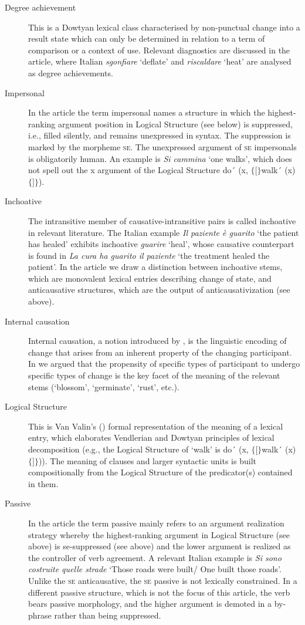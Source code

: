 \documentclass[output=paper,colorlinks,citecolor=brown
]{langscibook}
\begin{document}
\begin{description}
\item[Degree   achievement] This is a Dowtyan lexical class   characterised by non-punctual change into a result state which can only be   determined in relation to a term of comparison or a context of use. Relevant   diagnostics are discussed in the article, where Italian \textit{sgonfiare}   ‘deflate’ and \textit{riscaldare} ‘heat’ are analysed as degree achievements.
\item[Impersonal] In the article the term impersonal   names a structure in which the highest-ranking argument position in Logical   Structure (see below) is suppressed, i.e., filled silently, and remains   unexpressed in syntax. The suppression is marked by the morpheme \textsc{se}. The unexpressed argument of \textsc{se} impersonals is obligatorily human.  An example is \textit{Si cammina} ‘one   walks’, which does not spell out the x argument of the Logical Structure do´ (x, $\{ [ \}$walk´ (x) $\{] \}$).
\item[Inchoative] The intransitive member of   causative-intransitive pairs is called inchoative in relevant   literature. The Italian example \textit{Il paziente è guarito} ‘the patient has   healed’ exhibits inchoative \textit{guarire} ‘heal’, whose causative   counterpart is found in \textit{La cura ha guarito il paziente} ‘the treatment   healed the patient’. In the article we draw a distinction between inchoative stems,   which are monovalent lexical entries describing change of state, and anticausative   structures, which are the output of anticausativization (see above).
\item[Internal   causation] Internal causation, a notion introduced   by \citet{levin1995unaccusativity}, is the linguistic encoding of change   that arises from an inherent property of the changing participant. In \citet{bentley2023internally} we argued that the propensity of specific types of participant to   undergo specific types of change is the key facet of the meaning of the   relevant stems (‘blossom’, ‘germinate’, ‘rust’, etc.).
\item[Logical   Structure] This is Van Valin's (\citeyear{vanvalin2005exploring,vanvalin2023principles}) formal   representation of the meaning of a lexical entry, which elaborates Vendlerian   and Dowtyan principles of lexical decomposition (e.g., the Logical Structure   of ‘walk’ is do´   (x,   $\{ [ \}$walk´ (x)$\{] \}$)). The meaning of clauses   and larger syntactic units is built compositionally from the Logical   Structure of the predicator(s) contained in them.
\item[Passive] In the article the term passive   mainly refers to an argument realization strategy whereby the highest-ranking   argument in Logical Structure (see above) is se-suppressed   (see above) and the lower argument is realized as the controller of verb   agreement. A relevant Italian example is \textit{Si sono costruite quelle strade}   ‘Those roads were built/ One built those roads’. Unlike the \textsc{se} anticausative, the \textsc{se} passive is not lexically   constrained. In a different passive structure, which is not the focus of this   article, the verb bears passive morphology, and the higher argument is   demoted in a by-phrase rather than being suppressed.

\end{description}
\end{document}
